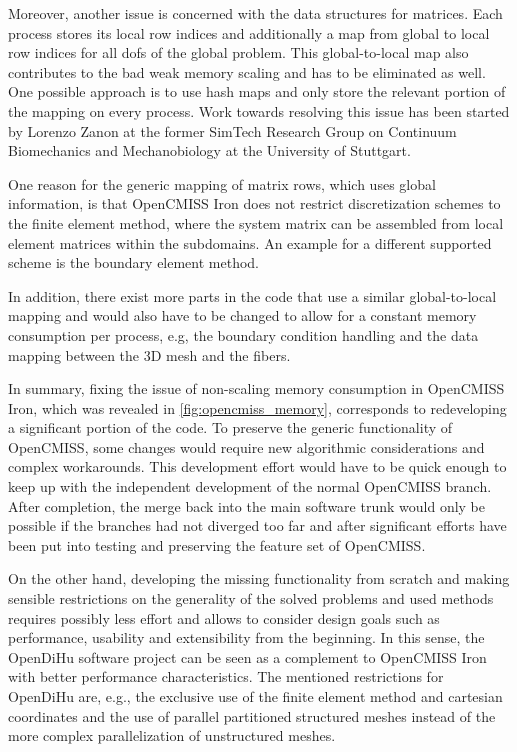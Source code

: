 Moreover, another issue is concerned with the data structures for matrices. Each process stores its local row indices and additionally a map from global to local row indices for all dofs of the global problem. This global-to-local map also contributes to the bad weak memory scaling and has to be eliminated as well. One possible approach is to use hash maps and only store the relevant portion of the mapping on every process. Work towards resolving this issue has been started by Lorenzo Zanon at the former SimTech Research Group on Continuum Biomechanics and Mechanobiology at the University of Stuttgart. 

One reason for the generic mapping of matrix rows, which uses global information, is that OpenCMISS Iron does not restrict discretization schemes to the finite element method, where the system matrix can be assembled from local element matrices within the subdomains. An example for a different supported scheme is the boundary element method.

In addition, there exist more parts in the code that use a similar global-to-local mapping and would also have to be changed to allow for a constant memory consumption per process, e.g, the boundary condition handling and the data mapping between the 3D mesh and the fibers.

In summary, fixing the issue of non-scaling memory consumption in OpenCMISS Iron, which was revealed in \cref{fig:opencmiss_memory}, corresponds to redeveloping a significant portion of the code. 
To preserve the generic functionality of OpenCMISS, some changes would require new algorithmic considerations and complex workarounds.
This development effort would have to be quick enough to keep up with the independent development of the normal OpenCMISS branch. After completion, the merge back into the main software trunk would only be possible if the branches had not diverged too far and after significant efforts have been put into testing and preserving the feature set of OpenCMISS.

On the other hand, developing the missing functionality from scratch and making sensible restrictions on the generality of the solved problems and used methods requires possibly less effort and allows to consider design goals such as performance, usability and extensibility from the beginning.
In this sense, the OpenDiHu software project can be seen as a complement to OpenCMISS Iron with better performance characteristics.  %
The mentioned restrictions for OpenDiHu are, e.g., the exclusive use of the finite element method and cartesian coordinates and the use of parallel partitioned structured meshes instead of the more complex parallelization of unstructured meshes.

